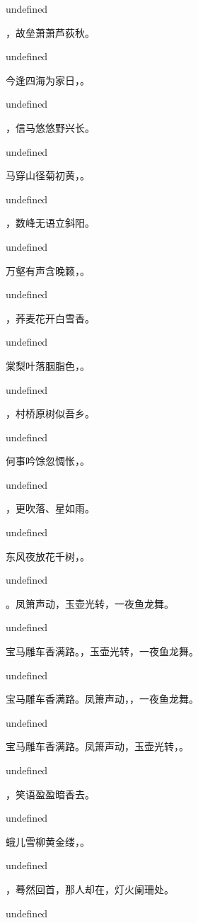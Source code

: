 \documentclass[12pt, a4paper, addpoints]{exam}
\begin{document}
\begin{questions}
undefined

\question[3] \fillin，故垒萧萧芦荻秋。

undefined

\question[3] 今逢四海为家日，\fillin。

undefined

\question[3] \fillin，信马悠悠野兴长。

undefined

\question[3] 马穿山径菊初黄，\fillin。

undefined

\question[3] \fillin，数峰无语立斜阳。

undefined

\question[3] 万壑有声含晚籁，\fillin。

undefined

\question[3] \fillin，荞麦花开白雪香。

undefined

\question[3] 棠梨叶落胭脂色，\fillin。

undefined

\question[3] \fillin，村桥原树似吾乡。

undefined

\question[3] 何事吟馀忽惆怅，\fillin。

undefined

\question[3] \fillin，更吹落、星如雨。

undefined

\question[3] 东风夜放花千树，\fillin。

undefined

\question[3] \fillin。凤箫声动，玉壶光转，一夜鱼龙舞。

undefined

\question[3] 宝马雕车香满路。\fillin，玉壶光转，一夜鱼龙舞。

undefined

\question[3] 宝马雕车香满路。凤箫声动，\fillin，一夜鱼龙舞。

undefined

\question[3] 宝马雕车香满路。凤箫声动，玉壶光转，\fillin。

undefined

\question[3] \fillin，笑语盈盈暗香去。

undefined

\question[3] 蛾儿雪柳黄金缕，\fillin。

undefined

\question[3] \fillin，蓦然回首，那人却在，灯火阑珊处。

undefined


\end{questions}
\end{document}
